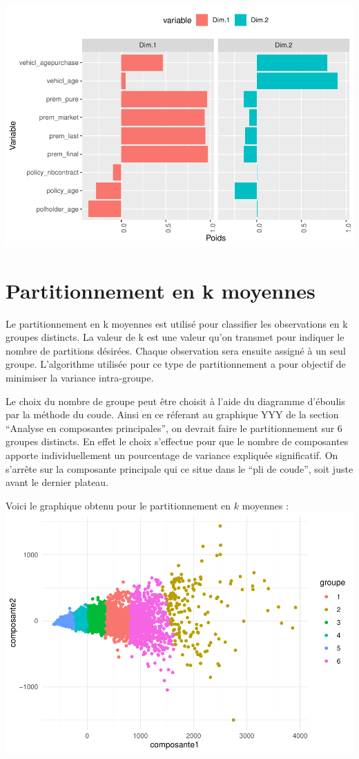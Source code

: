 \documentclass[
]{article}
\begin{document}
\includegraphics{01-01-Pretraitement_files/figure-latex/unnamed-chunk-5-1.pdf}

\newpage

\hypertarget{partitionnement-en-k-moyennes}{%
\section{Partitionnement en k
moyennes}\label{partitionnement-en-k-moyennes}}

Le partitionnement en k moyennes est utilisé pour classifier les
observations en k groupes distincts. La valeur de k est une valeur qu'on
transmet pour indiquer le nombre de partitions désirées. Chaque
observation sera ensuite assigné à un seul groupe. L'algorithme utilisée
pour ce type de partitionnement a pour objectif de minimiser la variance
intra-groupe.

Le choix du nombre de groupe peut être choisit à l'aide du diagramme
d'éboulis par la méthode du coude. Ainsi en ce réferant au graphique YYY
de la section ``Analyse en composantes principales'', on devrait faire
le partitionnement sur 6 groupes distincts. En effet le choix s'effectue
pour que le nombre de composantes apporte individuellement un
pourcentage de variance expliquée significatif. On s'arrête sur la
composante principale qui ce situe dans le ``pli de coude'', soit juste
avant le dernier plateau.

Voici le graphique obtenu pour le partitionnement en \(k\) moyennes :
\includegraphics{01-01-Pretraitement_files/figure-latex/unnamed-chunk-6-1.pdf}
\end{document}
